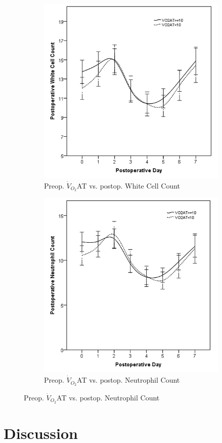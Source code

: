 \begin{figure}[p]
	\begin{subfigure}{0.48\textwidth}
		\centering
		\includegraphics[width=\textwidth]{Figures/sirs_at_wcc}
		\caption{Preop. $\dot{V}_{O_2}$AT vs. postop. White Cell Count}
		\label{fig:sirs_at_wcc}
	\end{subfigure}
	\hfill
	\begin{subfigure}{0.48\textwidth}
		\centering
		\includegraphics[width=\textwidth]{Figures/sirs_at_neut}
		\caption{Preop. $\dot{V}_{O_2}$AT vs. postop. Neutrophil Count}
		\label{fig:sirs_at_neut}
	\end{subfigure}	
\end{figure}


\section{Discussion}